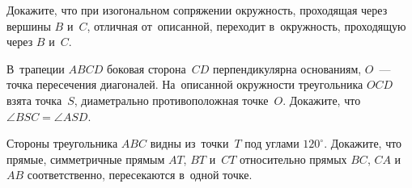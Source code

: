 \begin{problems}
\item
Докажите, что при изогональном сопряжении окружность, проходящая через
вершины $B$ и~$C$, отличная от~описанной, переходит в~окружность, проходящую
через $B$ и~$C$.

\item
В~трапеции $ABCD$ боковая сторона~$CD$ перпендикулярна основаниям,
$O$~--- точка пересечения диагоналей.
На~описанной окружности треугольника $OCD$ взята точка~$S$, диаметрально
противоположная точке~$O$.
Докажите, что $\angle BSC = \angle ASD$.

\item
Стороны треугольника $ABC$ видны из~точки~$T$ под углами $120^{\circ}$.
Докажите, что прямые, симметричные прямым $AT$, $BT$ и~$CT$ относительно прямых
$BC$, $CA$ и~$AB$ соответственно, пересекаются в~одной точке.

\end{problems}

